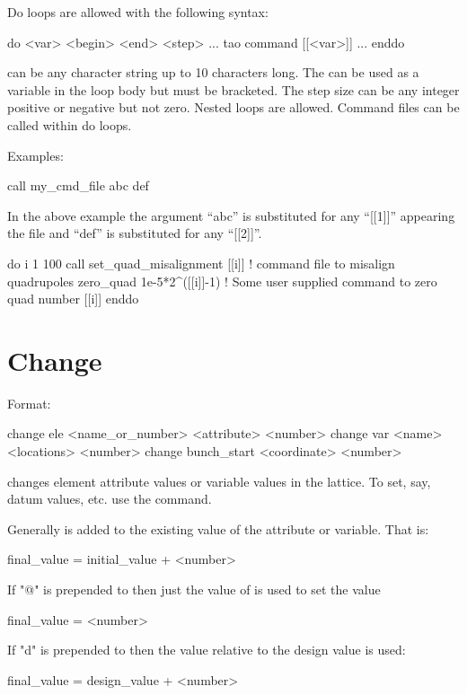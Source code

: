 Do loops are allowed with the following syntax:
\begin{example}
  do <var> <begin> <end> <step> 
    ...
    tao command [[<var>]]
    ...
  enddo
\end{example}
 can be any character string up to 10 characters long.
The  can be used as a variable in the loop body but must be
bracketed.  The step size can be any integer positive or negative but not zero.
Nested loops are allowed. Command files can be called within do loops.

Examples:
\begin{example}
    call my_cmd_file abc def 
\end{example}
In the above example the argument ``abc'' is substituted for any
``[[1]]'' appearing the file and ``def'' is substituted for any
``[[2]]''.
\Newline

\begin{example}
  do i 1 100
    call set_quad_misalignment [[i]] ! command file to misalign quadrupoles
    zero_quad 1e-5*2^([[i]]-1) ! Some user supplied command to zero quad number [[i]]
  enddo
\end{example}

\section{Change}
\label{s:change}

Format:
\begin{example}
  change ele <name_or_number> <attribute> <number>
  change var <name> <locations> <number>
  change bunch_start <coordinate> <number>
\end{example}

\vskip 0.2in  changes element attribute values or variable
values in the  lattice. To set, say, datum values, etc. use
the  command.

Generally  is added to the existing value of the
attribute or variable. That is:
\begin{example}
  final_value = initial_value + <number>
\end{example}
If "@" is prepended to  then just the value of
 is used to set the value
\begin{example}
  final_value = <number>
\end{example}
If "d" is prepended to  then the value relative to the design
value is used:
\begin{example}
  final_value = design_value + <number>
\end{example}

